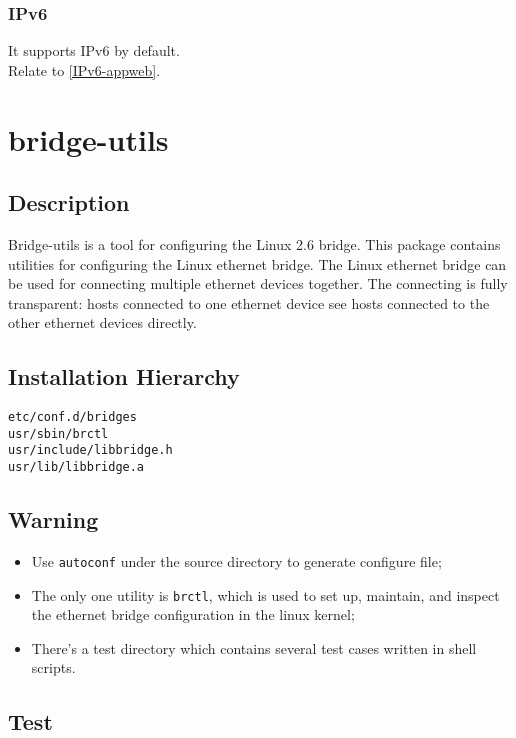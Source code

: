\documentclass[a4paper]{report}
\begin{document}
\subsection{IPv6}
It supports IPv6 by default.\\
Relate to \ref{IPv6-appweb}.


\chapter{bridge-utils}
\section{Description}
Bridge-utils is a tool for configuring the Linux 2.6 bridge. 
This package contains utilities for configuring the Linux ethernet bridge. 
The Linux ethernet bridge can be used for connecting multiple ethernet devices together. 
The connecting is fully transparent: hosts connected to one ethernet device 
see hosts connected to the other ethernet devices directly.
\section{Installation Hierarchy}
\begin{lstlisting}
etc/conf.d/bridges
usr/sbin/brctl
usr/include/libbridge.h
usr/lib/libbridge.a
\end{lstlisting}
\section{Warning}
\begin{itemize}
    \item Use {\tt autoconf} under the source directory to generate configure file;
    \item The only one utility is {\tt brctl}, which is used to set up, maintain, 
          and inspect the ethernet bridge configuration in the linux kernel;
    \item There's a test directory which contains several test cases written 
          in shell scripts.
\end{itemize}
\section{Test}
\end{document}
